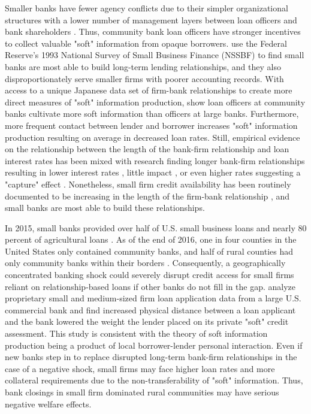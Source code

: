 \documentclass[preprint,12pt]{elsarticle}
\begin{document}
Smaller banks have fewer agency conflicts due to their simpler organizational structures with a lower number of management layers between loan officers and bank shareholders \citep{Berger2002}.  Thus, community bank loan officers have stronger incentives to collect valuable "soft" information from opaque borrowers.  \citet{Berger2005} use the Federal Reserve's 1993 National Survey of Small Business Finance (NSSBF) to find small banks are most able to build long-term lending relationships, and they also disproportionately serve smaller firms with poorer accounting records.  With access to a unique Japanese data set of firm-bank relationships to create more direct measures of "soft" information production, \citet{Uchida2012} show loan officers at community banks cultivate more soft information  than officers at large banks. Furthermore, more frequent contact between lender and borrower increases "soft" information production resulting on average in decreased loan rates.  Still, empirical evidence on the relationship between the length of the bank-firm relationship and loan interest rates has been mixed with research finding longer bank-firm relationships resulting in lower interest rates \citep{Berger1995}, little impact \citep{Petersen1994}, or even higher rates suggesting a "capture" effect \citep{Degryse2000,Kano2011}.  Nonetheless, small firm credit availability has been routinely documented to be increasing in the length of the firm-bank relationship \citep{Petersen1994,Kano2011}, and small banks are most able to build these relationships.

In 2015, small banks provided over half of U.S. small business loans and nearly 80 percent of agricultural loans \citep{LuxRobertGreene2015}.  As of the end of 2016, one in four counties in the United States only contained community banks, and half of rural counties had only community banks within their borders \citep{Mnuchin2017}.  Consequently, a geographically concentrated banking shock could severely disrupt credit access for small firms reliant on relationship-based loans if other banks do not fill in the gap.  \citet{Agarwal2010} analyze proprietary small and medium-sized firm loan application data from a large U.S. commercial bank and find increased physical distance between a loan applicant and the bank lowered the weight the lender placed on its private "soft" credit assessment.  This study is consistent with the theory of soft information production being a product of local borrower-lender personal interaction. Even if new banks step in to replace disrupted long-term bank-firm relationships in the case of a negative shock, small firms may face higher loan rates and more collateral requirements due to the non-transferability of "soft" information.  Thus, bank closings in small firm dominated rural communities may have serious negative welfare effects.
\end{document}
